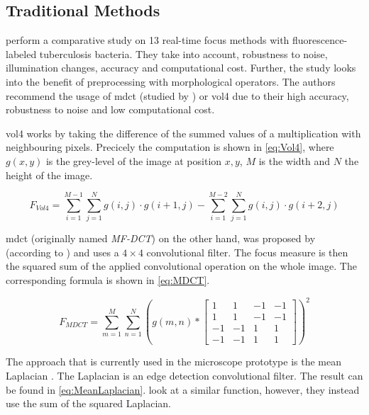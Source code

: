 \subsection{Traditional Methods}
\label{sec:Foundations:RelatedWorks:Traditional}


\textcite{mateos-perez2012comparative} perform a comparative study on 13 real-time focus methods with fluorescence-labeled tuberculosis bacteria. They take into account, robustness to noise, illumination changes, accuracy and computational cost. Further, the study looks into the benefit of preprocessing with morphological operators.
The authors recommend the usage of \ac{mdct} (studied by \textcite{lee2008enhanced}) or \ac{vol4} \cite{vollath1988influence} due to their high accuracy, robustness to noise and low computational cost.

\ac{vol4} works by taking the difference of the summed values of a multiplication with neighbouring pixels. Precicely the computation is shown in \autoref{eq:Vol4}, where $g(x, y)$ is the grey-level of the image at position $x,y$, $M$ is the width and $N$ the height of the image.

\begin{equation}
    \label{eq:Vol4}
    F_{Vol4} = \sum_{i=1}^{M-1}\sum_{j=1}^{N} g(i,j) \cdot g(i+1, j) - \sum_{i=1}^{M-2}\sum_{j=1}^{N} g(i,j) \cdot g(i+2, j)
\end{equation}


\Ac{mdct} (originally named \emph{MF-DCT}) on the other hand, was proposed by \textcite{lee2008enhanced} (according to \textcite{redondo2012autofocus}) and uses a $4 \times 4$ convolutional filter. The focus measure is then the squared sum of the applied convolutional operation on the whole image. The corresponding formula is shown in \autoref{eq:MDCT}.

\begin{equation}
    \label{eq:MDCT}
    F_{MDCT}= \sum_{m=1}^{M}\sum_{n=1}^{N}
    ( g(m,n) *
    \begin{bmatrix}
        1 & 1 & -1 & -1 \\
        1 & 1 & -1 & -1 \\
        -1 & -1 & 1 & 1 \\
        -1 & -1 & 1 & 1
    \end{bmatrix}
    )^2
\end{equation}

The approach that is currently used in the microscope prototype is the mean Laplacian . The Laplacian is an edge detection convolutional filter. The result can be found in \autoref{eq:MeanLaplacian}. \textcite{redondo2012autofocus} look at a similar function, however, they instead use the sum of the squared Laplacian.

